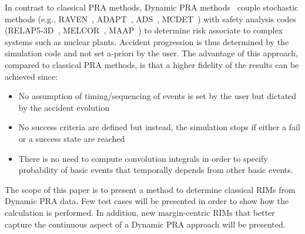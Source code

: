 In contrast to classical PRA methods, Dynamic PRA methods~\cite{DEVOOGHT_DynamicPRA} couple stochastic methods 
(e.g., RAVEN~\cite{RAVEN_PSAM_2014}, ADAPT~\cite{ADAPT}, ADS~\cite{ADS}, MCDET~\cite{MCDET}) with safety analysis 
codes (RELAP5-3D~\cite{relap5}, MELCOR~\cite{Melcor}, MAAP~\cite{maap}) to determine risk associate to 
complex systems such as nuclear plants. Accident progression is thus determined by the 
simulation code and not set a-priori by the user. The advantage of this approach, 
compared to classical PRA methods, is that a higher fidelity of the results can be achieved since:
\begin{itemize}
  \item No assumption of timing/sequencing of events is set by the user but dictated by the 
        accident evolution
  \item No success criteria are defined but instead, the simulation stops if either a fail 
        or a success state are reached
  \item There is no need to compute convolution integrals in order to specify probability of 
        basic events that temporally depends from other basic events.
\end{itemize}

The scope of this paper is to present a method to determine classical RIMs from Dynamic PRA 
data. Few test cases will be presented in order to show how the calculation is performed. 
In addition, new margin-centric RIMs that better capture the continuous aspect of a Dynamic 
PRA approach will be presented.

